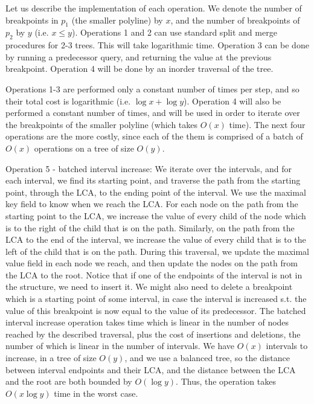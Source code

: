 \documentclass[11pt,a4paper]{article}
\theoremstyle{definition}
\theoremstyle{remark}
\begin{document}
Let us describe the implementation of each operation. We denote the number of breakpoints in $p_1$ (the smaller polyline) by $x$, and the number of breakpoints of $p_2$ by $y$ (i.e. $x \leq y$). Operations 1 and 2 can use standard split and merge procedures for 2-3 trees. This will take logarithmic time. Operation 3 can be done by running a predecessor query, and returning the value at the previous breakpoint. Operation 4 will be done by an inorder traversal of the tree.

Operations 1-3 are performed only a constant number of times per step, and so their total cost is logarithmic (i.e. $\log x + \log y$). Operation 4 will also be performed a constant number of times, and will be used in order to iterate over the breakpoints of the smaller polyline (which takes $O(x)$ time). The next four operations are the more costly, since each of the them is comprised of a batch of $O(x)$ operations on a tree of size $O(y)$.

Operation 5 - batched interval increase: We iterate over the intervals, and for each interval, we find its starting point, and traverse the path from the starting point, through the LCA, to the ending point of the interval. We use the maximal key field to know when we reach the LCA. For each node on the path from the starting point to the LCA, we increase the value of every child of the node which is to the right of the child that is on the path. Similarly, on the path from the LCA to the end of the interval, we increase the value of every child that is to the left of the child that is on the path. During this traversal, we update the maximal value field in each node we reach, and then update the nodes on the path from the LCA to the root. Notice that if one of the endpoints of the interval is not in the structure, we need to insert it. We might also need to delete a breakpoint which is a starting point of some interval, in case the interval is increased  s.t. the value of this breakpoint is now equal to the value of its predecessor. The batched interval increase operation takes time which is linear in the number of nodes reached by the described traversal, plus the cost of insertions and deletions, the number of which is linear in the number of intervals. We have $O(x)$ intervals to increase, in a tree of size $O(y)$, and we use a balanced tree, so the distance between interval endpoints and their LCA, and the distance between the LCA and the root are both bounded by $O(\log y)$. Thus, the operation takes $O(x \log y)$ time in the worst case.
\end{document}

